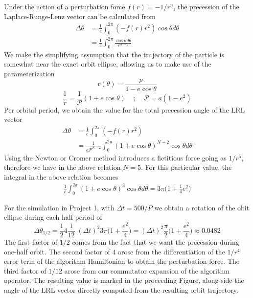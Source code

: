 \documentclass[8pt,a4paper]{article}
\begin{document}
	Under the action of a perturbation force $f(r) = -1/r^n$, the precession of the Laplace-Runge-Lenz vector can be calculated from
	\begin{align*}
		\Delta \theta &= \frac{1}{e}\int_{0}^{2\pi}(-f(r)r^2)\cos\theta d\theta \\
		&= \frac{1}{e}\int_{0}^{2\pi}\frac{\cos\theta d\theta}{r^{N-2}}
	\end{align*}
	We make the simplifying assumption that the trajectory of the particle is somewhat near the exact orbit ellipse, allowing us to make use of the parameterization
	\begin{equation}
		r(\theta) = \frac{p}{1-e\cos\theta}
	\end{equation}
	\begin{equation}
		\frac{1}{r} = \frac{1}{\mathcal{P}}(1+ e\cos\theta)\;\;\;\;;\;\;\;\; \mathcal{P} = a(1-e^2)
	\end{equation}
	Per orbital period, we obtain the value for the total precession angle of the LRL vector
	\begin{align*}
		\Delta \theta &= \frac{1}{e}\int_{0}^{2\pi}(-f(r)r^2) \\
		&= \frac{1}{e\mathcal{P}^{N-2}}\int_{0}^{2\pi} (1+e\cos\theta)^{N-2} \cos\theta d\theta
	\end{align*}
	Using the Newton or Cromer method introduces a fictitious force going as $1/r^5$, therefore we have in the above relation $N=5$. For this particular value, the integral in the above relation becomes
	\begin{align}
		\frac{1}{e}\int_{0}^{2\pi} (1+e\cos\theta)^{3} \cos\theta d\theta = 3\pi\Big(1 + \frac{1}{4}e^2\Big)
	\end{align}
	
	For the simulation in Project 1, with $\Delta t = 500/P$ we obtain a rotation of the obit ellipse during each half-period of
	\begin{equation}
		\Delta \theta_\text{1/2} = \frac{1}{2}4\frac{1}{12}\;(\Delta t)^2 3\pi \Big(1+\frac{e^2}{4}\Big) = (\Delta t)^2 \frac{\pi}{2}\Big(1+\frac{e^2}{4}\Big) \approx 0.0482
	\end{equation}
	The first factor of $1/2$ comes from the fact that we want the precession during one-half orbit. The second factor of $4$ arose from the differentiation of the $1/r^4$ error term of the algorithm Hamiltonian to obtain the perturbation force. The third factor of $1/12$ arose from our commutator expansion of the algorithm operator. The resulting value is marked in the proceeding Figure, along-side the angle of the LRL vector directly computed from the resulting orbit trajectory.
	
\end{document}
